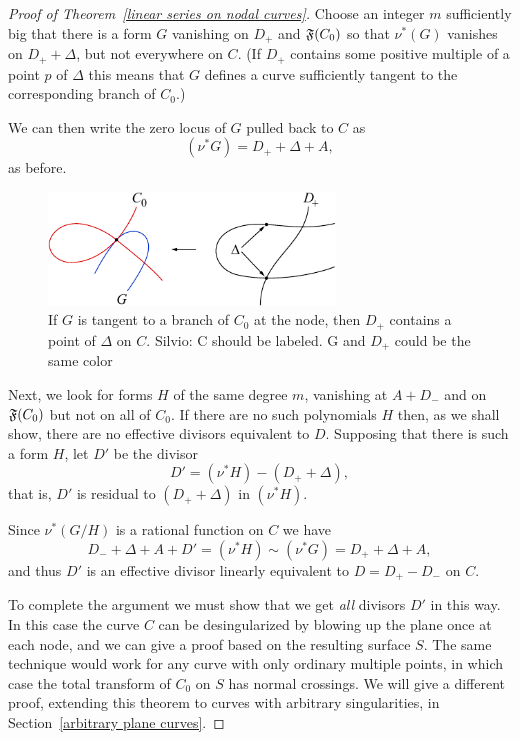 \begin{proof}[Proof of Theorem~\ref{linear series on nodal curves}]
 Choose an integer $m$ sufficiently big that there is a form $G$ vanishing on  $D_{+}$ and ${\mathfrak F}(C_{0})$ so that
 $\nu^{*}(G)$ vanishes on $D_{+}+\Delta$, but not everywhere on $C$.
 (If $D_{+}$ contains some positive multiple of a point $p$ of $\Delta$ this means that $G$ defines
 a curve sufficiently tangent to the corresponding branch of $C_0$.) 
 
 We can then write the zero locus of $G$ pulled back to $C$ as
$$
(\nu^*G) = D_{+} + \Delta + A,
$$
as before. 

\begin{figure}
\centerline {\includegraphics[width=3.0in]{"main/Fig14-3"}}
\caption{If $G$ is tangent to a branch of $C_{0}$ at the node, then $D_{+}$ contains
a point of $\Delta$ on $C$. {Silvio: C should be labeled. G and $D_{+}$ could be the same color}}
\label{Fig14.2}
\end{figure}

Next, we look for forms $H$ of the same degree $m$, vanishing at $A+D_{-}$ and on ${\mathfrak F}(C_{0})$
 but not on all of $C_0$. If there are no such polynomials $H$ then, as we shall show,
there are no effective divisors equivalent to $D$. Supposing that there is such a form $H$, let $D'$ be the divisor 
$$
D' = (\nu^*H) -( D_{+} + \Delta),
$$
that is, $D'$ is residual to $( D_{+} + \Delta)$ in $(\nu^*H)$. 

Since $\nu^*(G/H)$ is a rational function on $C$ we have
$$
D_{-} +\Delta + A+ D' = (\nu^*H) \sim (\nu^*G) = D_{+} + \Delta + A,
$$
and thus $D'$ is an effective divisor linearly equivalent to $D = D_{+}-D_{-}$ on $C$.

To complete the argument we must show that we get \emph{all} divisors $D'$ in this way.
In this case the curve $C$ can be desingularized by blowing up the plane once at each node,
and we can give a proof based on the resulting surface $S$. The same technique would work for any curve with only
ordinary multiple points, in which case the total transform of $C_{0}$ on $S$ has normal crossings. We will give a different proof, extending this theorem to curves with arbitrary singularities, in Section~\ref{arbitrary plane curves}.


\end{proof}

